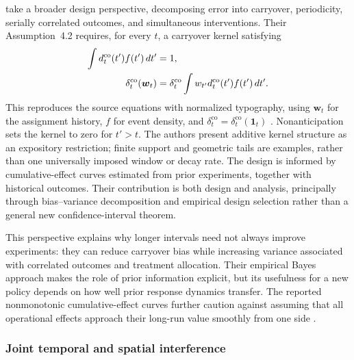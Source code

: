 \documentclass[12pt]{article}
\begin{document}
\citet{xiong2024} take a broader design perspective, decomposing error into carryover, periodicity, serially correlated outcomes, and simultaneous interventions. Their Assumption~4.2 requires, for every $t$, a carryover kernel satisfying
\begin{align}
 \int d_t^{\mathrm{co}}(t')f(t')\,dt'&=1,\notag\\
 \delta_t^{\mathrm{co}}(\boldsymbol w_t)
 &=\delta_t^{\mathrm{co}}\int w_{t'}d_t^{\mathrm{co}}(t')f(t')\,dt'.
 \label{eq:xiong-carryover-kernel}
\end{align}
This reproduces the source equations with normalized typography, using $\boldsymbol w_t$ for the assignment history, $f$ for event density, and $\delta_t^{\mathrm{co}}=\delta_t^{\mathrm{co}}(\boldsymbol1_t)$ \citep[Assumption~4.2, p.~21]{xiong2024}. Nonanticipation sets the kernel to zero for $t'>t$. The authors present additive kernel structure as an expository restriction; finite support and geometric tails are examples, rather than one universally imposed window or decay rate. The design is informed by cumulative-effect curves estimated from prior experiments, together with historical outcomes. Their contribution is both design and analysis, principally through bias--variance decomposition and empirical design selection rather than a general new confidence-interval theorem.

This perspective explains why longer intervals need not always improve experiments: they can reduce carryover bias while increasing variance associated with correlated outcomes and treatment allocation. Their empirical Bayes approach makes the role of prior information explicit, but its usefulness for a new policy depends on how well prior response dynamics transfer. The reported nonmonotonic cumulative-effect curves further caution against assuming that all operational effects approach their long-run value smoothly from one side \citep[Sections~1 and~6]{xiong2024}.


\subsubsection{Joint temporal and spatial interference}
\end{document}
